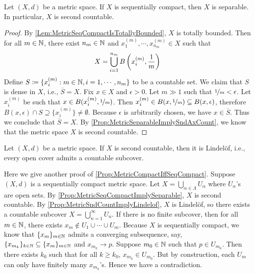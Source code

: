 \documentclass[screen,single]{techreport}
\numberwithin{equation}{section}
\begin{document}
\begin{proposition}\label{Prop:MetricSeqCompactImplySeparable}
	Let $(X,d)$ be a metric space.
	If $X$ is sequentially compact, then $X$ is separable.
	In particular, $X$ is second countable.
\end{proposition}
\begin{proof}
	By \cref{Lem:MetricSeqCompactIsTotallyBounded}, $X$ is totally bounded.
	Then for all $m \in \mathbb{N}$, there exist $n_m \in \mathbb{N}$ and $x^{(m)}_1,\cdots,x^{(m)}_{n_m} \in X$ such that
	\[
	X = \bigcup_{i=1}^{n_m} B\left({ x^{(m)}_i, \frac{1}{m}}\right) 
	\]
	Define $S \coloneqq \{ x^{(m)}_i : m \in \mathbb{N}, i=1,\cdots,n_m \}$ to be a countable set.
	We claim that $S$ is dense in $X$, i.e., $\overline{S} = X$.
	Fix $x \in X$ and $\epsilon > 0$.
	Let $m \gg 1$ such that $\nicefrac{1}{m} < \epsilon$.
	Let $x^{(m)}_i$ be such that $x \in B(x^{(m)}_i, \nicefrac{1}{m})$.
	Then $x^{(m)}_i \in B(x,\nicefrac{1}{m}) \subseteq B(x,\epsilon)$, therefore $B(x,\epsilon) \cap S \supseteq \{ x^{(m)}_i \} \neq \emptyset$.
	Because $\epsilon$ is arbitrarily chosen, we have $x \in \overline{S}$.
	Thus we conclude that $\overline{S} = X$.
	By \cref{Prop:MetricSeparableImplySndAxCount}, we know that the metric space $X$ is second countable.
\end{proof}

\begin{proposition}\label{Prop:MetricSndCountImplyLindelof}
	Let $(X,d)$ be a metric space.
	If $X$ is second countable, then it is Lindel{\"o}f, i.e., every open cover admits a countable subcover.
\end{proposition}

\begin{remark}\label{Rem:AnotherProofMetricSeqCompactImplyCompact}
	Here we give another proof of \cref{Prop:MetricCompactIffSeqCompact}.
	Suppose $(X,d)$ is a sequentially compact metric space.
	Let $X = \bigcup_{\alpha \in \Lambda} U_\alpha$ where $U_\alpha$'s are open sets.
	By \cref{Prop:MetricSeqCompactImplySeparable}, $X$ is second countable.
	By \cref{Prop:MetricSndCountImplyLindelof}, $X$ is Lindel{\"o}f, so there exists a countable subcover $X = \bigcup_{n=1}^\infty U_n$.
	If there is no finite subcover, then for all $m \in \mathbb{N}$, there exists $x_m \not\in U_1 \cup \cdots \cup U_m$.
	Because $X$ is sequentially compact, we know that $\{x_m\}_{m \in \mathbb{N}}$ admits a converging subsequence, say, $\{x_{m_k}\}_{k \in \mathbb{N}} \subseteq \{ x_m \}_{m \in \mathbb{N}}$ and $x_{m_k} \rightarrow p$.
	Suppose $m_0 \in \mathbb{N}$ such that $p \in U_{m_0}$.
	Then there exists $k_0$ such that for all $k \ge k_0$, $x_{m_k} \in U_{m_0}$.
	But by construction, each $U_m$ can only have finitely many $x_{m_k}$'s.
	Hence we have a contradiction.
\end{remark}
\end{document}
